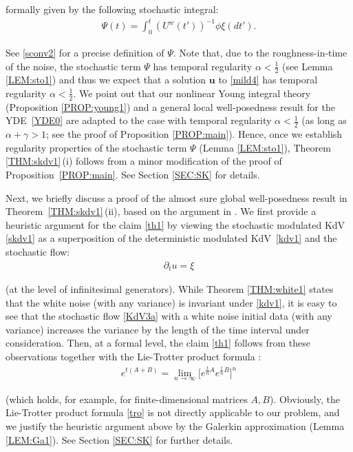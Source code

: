 \documentclass[letterpaper, 11pt,  reqno]{amsart}
\newcommand{\1}{\hspace{0.5mm}\text{I}\hspace{0.5mm}}
\newcommand{\noi}{\noindent}
\newcommand{\al}{\alpha}
\newcommand{\g}{\gamma}
\newcommand{\dt}{\partial_t}
\newcommand{\uu}{\mathbf{u}}
\numberwithin{equation}{section}
\numberwithin{theorem}{section}
\begin{document}
\noi
formally given by the following stochastic integral:
\begin{align}
 \Psi(t) =  \int_0^t  (U^w({t'}))^{-1} \phi \xi( dt').
\label{sconv1}
\end{align}


\noi
See 
\eqref{sconv2} for a precise definition of $\Psi$.
Note that, due to the roughness-in-time of the noise, 
the stochastic term $\Psi$
has temporal regularity $\al < \frac 12$
(see 
Lemma \ref{LEM:sto1})
and thus we expect that a solution $\uu$
to \eqref{mild4} 
has temporal regularity $\al < \frac 12$.
We point out that 
 our nonlinear Young integral theory
(Proposition \ref{PROP:young1})
and a general local well-posedness
result 
for the YDE~\eqref{YDE0}
are adapted to the case 
with temporal regularity $\al < \frac 12$
(as long as $\al + \g > 1$; see the proof of Proposition \ref{PROP:main}).
Hence, once we establish regularity properties
of the stochastic term $\Psi$ (Lemma \ref{LEM:sto1}), 
Theorem \ref{THM:skdv1}\,(i) follows
from a minor modification of the proof of 
Proposition~\ref{PROP:main}.
See Section \ref{SEC:SK}
for details.



\medskip



Next, we briefly discuss a proof of 
the almost sure global well-posedness result in Theorem~\ref{THM:skdv1}\,(ii), 
based on the argument in \cite{OQS}.
We first 
 provide a heuristic argument for the claim \eqref{th1}
 by viewing the stochastic modulated KdV \eqref{skdv1}
 as a
superposition of the deterministic modulated KdV~\eqref{kdv1}
and the stochastic flow:
\begin{align}
\dt  u = \xi
\label{KdV3a}
\end{align}

\noi
(at the level of infinitesimal generators).
While 
Theorem \ref{THM:white1}
states that 
the white noise (with any variance) is invariant under \eqref{kdv1}, 
it is easy to see that 
the stochastic flow \eqref{KdV3a} with a white noise initial data (with any variance)
increases the variance by the length of the time interval under consideration.
Then, at a formal level, 
the claim \eqref{th1} follows
from these observations 
 together with 
the 
Lie-Trotter product formula \cite[Section VIII.8]{RS}:
\begin{align}
e^{t (A+ B)} = \lim_{n \to \infty} \big[ e^{\frac tn A}e^{\frac tn B}\big]^n
\label{tro}
\end{align}

\noi
(which holds, for example, 
for finite-dimensional matrices $A, B$).
Obviously, 
the Lie-Trotter product formula \eqref{tro}
is not directly applicable to our problem, 
and we justify the heuristic argument above
by  the Galerkin approximation (Lemma \ref{LEM:Ga1}).
See Section \ref{SEC:SK}
for further details.
\end{document}
